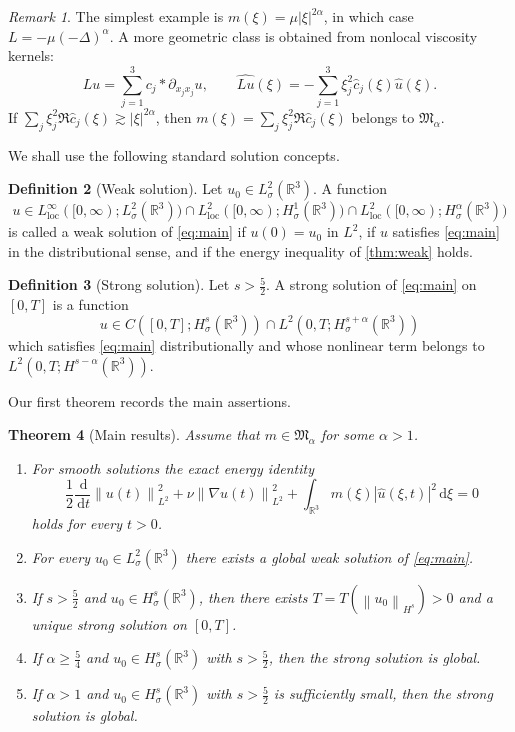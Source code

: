 \documentclass[11pt]{article}
\newtheorem{theorem}{Theorem}[section]
\theoremstyle{definition}
\newtheorem{definition}[theorem]{Definition}
\theoremstyle{remark}
\newtheorem{remark}[theorem]{Remark}
\newcommand{\R}{\mathbb{R}}
\newcommand{\dd}{\,\mathrm{d}}
\newcommand{\norm}[1]{\left\lVert #1\right\rVert}
\newcommand{\abs}[1]{\left\lvert #1\right\rvert}
\begin{document}
\begin{remark}
The simplest example is $m(\xi)=\mu |\xi|^{2\alpha}$, in which case $L=-\mu(-\Delta)^\alpha$. A more geometric class is obtained from nonlocal viscosity kernels:
\[
L u = \sum_{j=1}^3 c_j * \partial_{x_jx_j} u,
\qquad
\widehat{L u}(\xi)= - \sum_{j=1}^3 \xi_j^2 \hat c_j(\xi) \hat u(\xi).
\]
If $\sum_j \xi_j^2 \Re \hat c_j(\xi)\gtrsim |\xi|^{2\alpha}$, then $m(\xi)=\sum_j \xi_j^2 \Re \hat c_j(\xi)$ belongs to $\mathfrak M_\alpha$.
\end{remark}

We shall use the following standard solution concepts.

\begin{definition}[Weak solution]
Let $u_0\in L^2_\sigma(\R^3)$. A function
\[
u\in L^\infty_{\mathrm{loc}}([0,\infty);L^2_\sigma(\R^3))
\cap
L^2_{\mathrm{loc}}([0,\infty);H^1_\sigma(\R^3))
\cap
L^2_{\mathrm{loc}}([0,\infty);H^\alpha_\sigma(\R^3))
\]
is called a weak solution of \eqref{eq:main} if $u(0)=u_0$ in $L^2$, if $u$ satisfies \eqref{eq:main} in the distributional sense, and if the energy inequality of \cref{thm:weak} holds.
\end{definition}

\begin{definition}[Strong solution]
Let $s>\frac52$. A strong solution of \eqref{eq:main} on $[0,T]$ is a function
\[
u\in C([0,T];H^s_\sigma(\R^3))
\cap
L^2(0,T;H^{s+\alpha}_\sigma(\R^3))
\]
which satisfies \eqref{eq:main} distributionally and whose nonlinear term belongs to $L^2(0,T;H^{s-\alpha}(\R^3))$.
\end{definition}

Our first theorem records the main assertions.

\begin{theorem}[Main results]\label{thm:main}
Assume that $m\in\mathfrak M_\alpha$ for some $\alpha>1$.
\begin{enumerate}[label=(\roman*)]
\item For smooth solutions the exact energy identity
\[
\frac12 \frac{\dd}{\dd t}\norm{u(t)}_{L^2}^2
+
\nu \norm{\nabla u(t)}_{L^2}^2
+
\int_{\R^3} m(\xi)\abs{\hat u(\xi,t)}^2 \dd \xi
=0
\]
holds for every $t>0$.
\item For every $u_0\in L^2_\sigma(\R^3)$ there exists a global weak solution of \eqref{eq:main}.
\item If $s>\frac52$ and $u_0\in H^s_\sigma(\R^3)$, then there exists $T=T(\norm{u_0}_{H^s})>0$ and a unique strong solution on $[0,T]$.
\item If $\alpha\ge \frac54$ and $u_0\in H^s_\sigma(\R^3)$ with $s>\frac52$, then the strong solution is global.
\item If $\alpha>1$ and $u_0\in H^s_\sigma(\R^3)$ with $s>\frac52$ is sufficiently small, then the strong solution is global.
\end{enumerate}
\end{theorem}
\end{document}
